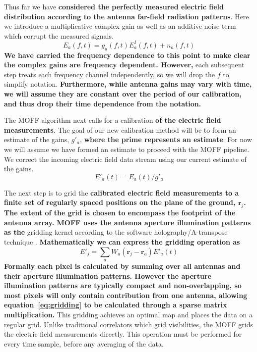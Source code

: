 \documentclass[a4paper,fleqn,usenatbib]{../mnras}
\begin{document}
Thus far we have \textbf{considered the perfectly measured electric field distribution according to 
the antenna far-field radiation patterns}. Here we introduce a multiplicative complex gain as 
well as an additive noise term which corrupt the measured signals.
\begin{equation}\label{eq:apply_gain}
E_a(f,t) = g_a(f,t) E_a^I(f,t) + n_a(f,t)
\end{equation}
\textbf{We have carried the frequency dependence to this point to make clear the complex gains are
frequency dependent. However,} each subsequent step treats each frequency 
channel independently, so we will drop the $f$ to simplify notation. 
\textbf{Furthermore, while antenna gains may vary with time, we will assume they are constant over
the period of our calibration, and thus drop their time dependence from the notation.}

The MOFF algorithm next calls for a calibration \textbf{of the electric field measurements}. The goal of our new calibration method will be 
to form an estimate of the gains, $g'_a$, \textbf{where the prime represents an estimate}. For now we will assume we have formed an estimate 
to proceed with the MOFF pipeline. We correct the incoming electric field data stream using our 
current estimate of the gains.
\begin{equation}
E'_a(t) = E_a(t)/ g'_a
\end{equation}

The next step is to grid the \textbf{calibrated electric field measurements to a finite set of regularly spaced 
positions on the plane of the ground, $\mathbf{r}_j$.
The extent of the grid is chosen to encompass the footprint of the antenna array.
MOFF uses the antenna aperture illumination patterns as the} gridding 
kernel according to the software holography/A-transpose technique \citep{mor09,bha08}. 
\textbf{Mathematically we can express the gridding operation as}
\begin{equation}\label{eq:gridding}
E'_j=\sum_a W_a(\mathbf{r}_j-\mathbf{r}_a) E'_a(t)
\end{equation}
\textbf{Formally each pixel is calculated by summing over all antennas and their aperture illumination patterns.
However the aperture illumination patterns are typically compact and non-overlapping, so most pixels
will only contain contribution from one antenna, allowing equation~\ref{eq:gridding}
to be calculated through a sparse matrix multiplication.}
This gridding 
achieves an optimal map \citep{teg97b} and places the data on a regular grid. Unlike 
traditional correlators which grid visibilities, the MOFF grids the electric field measurements directly. This 
operation must be performed for every time sample, before any averaging of the data.
\end{document}
